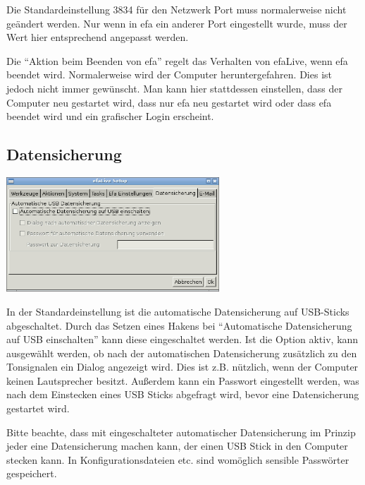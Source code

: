 \documentclass[a4paper,12pt,twoside]{article}
\begin{document}
Die Standardeinstellung 3834 für den Netzwerk Port muss normalerweise nicht 
geändert werden. Nur wenn in efa ein
anderer Port eingestellt wurde, muss der Wert hier entsprechend
angepasst werden.

Die "`Aktion beim Beenden von efa"' regelt das
Verhalten von efaLive, wenn efa beendet wird. Normalerweise wird der
Computer heruntergefahren. Dies ist jedoch nicht immer gewünscht. Man
kann hier stattdessen einstellen, dass der Computer neu gestartet wird, 
dass nur efa neu gestartet wird oder dass efa beendet wird und ein 
grafischer Login erscheint.


\subsection{Datensicherung}
\label{sct:efalivesetup_backup}

\bigskip
\begin{minipage}{\linewidth}
    \centering
    \captionsetup{type=figure}
    \includegraphics[width=8cm]{screenshots/efalive_setup_backup.png}
    \label{fig:efalivesetup_backup}
\end{minipage}
\bigskip

In der Standardeinstellung ist die automatische Datensicherung auf
USB-Sticks abgeschaltet. Durch das Setzen eines Hakens bei
"`Automatische Datensicherung auf USB
einschalten"' kann diese eingeschaltet werden. Ist die
Option aktiv, kann ausgewählt werden, ob nach der automatischen
Datensicherung zusätzlich zu den Tonsignalen ein Dialog angezeigt wird.
Dies ist z.B. nützlich, wenn der Computer keinen Lautsprecher besitzt. 
Außerdem kann ein Passwort eingestellt werden, was nach dem Einstecken
eines USB Sticks abgefragt wird, bevor eine Datensicherung gestartet wird.

Bitte beachte, dass mit eingeschalteter automatischer Datensicherung im
Prinzip jeder eine Datensicherung machen kann, der einen USB Stick in
den Computer stecken kann. In Konfigurationsdateien etc. sind womöglich
sensible Passwörter gespeichert.
\end{document}

